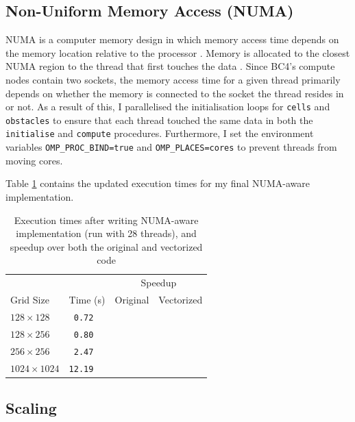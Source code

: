 \documentclass[twocolumn, a4paper]{article}
\begin{document}
\subsection{Non-Uniform Memory Access (NUMA)}

NUMA is a computer memory design in which memory access time depends on the memory location relative to the processor \cite{numa}.
Memory is allocated to the closest NUMA region to the thread that first touches the data \cite{numa_bristol}.
Since BC4's compute nodes contain two sockets, the memory access time for a given thread primarily depends on whether the memory is connected to the socket the thread resides in or not.
As a result of this, I parallelised the initialisation loops for \texttt{cells} and \texttt{obstacles} to ensure that each thread touched the same data in both the \texttt{initialise} and \texttt{compute} procedures.
Furthermore, I set the environment variables \texttt{OMP\_PROC\_BIND=true} and \texttt{OMP\_PLACES=cores} to prevent threads from moving cores.

Table \ref{tab:numa} contains the updated execution times for my final NUMA-aware implementation.

\begin{table}[htbp]
  \begin{center}
  \caption{Execution times after writing NUMA-aware implementation (run with 28 threads), and speedup over both the original and vectorized code}\label{tab:numa}
  \begin{tabular}{l | l  l  l} 
      \hline\hline
      &&\multicolumn{2}{c}{Speedup}\\
      \cline{3-4}
      Grid Size&Time (s)&Original&Vectorized\\
      \hline
      $128 \times 128$&\texttt{ 0.72}&\texttt{}&\texttt{}\\
      $128 \times 256$&\texttt{ 0.80}&\texttt{}&\texttt{}\\
      $256 \times 256$&\texttt{ 2.47}&\texttt{}&\texttt{}\\
      $1024 \times 1024$&\texttt{12.19}&\texttt{}&\texttt{}\\
      \hline
    \end{tabular}
  \end{center}
\end{table}

\subsection{Scaling}
\end{document}
